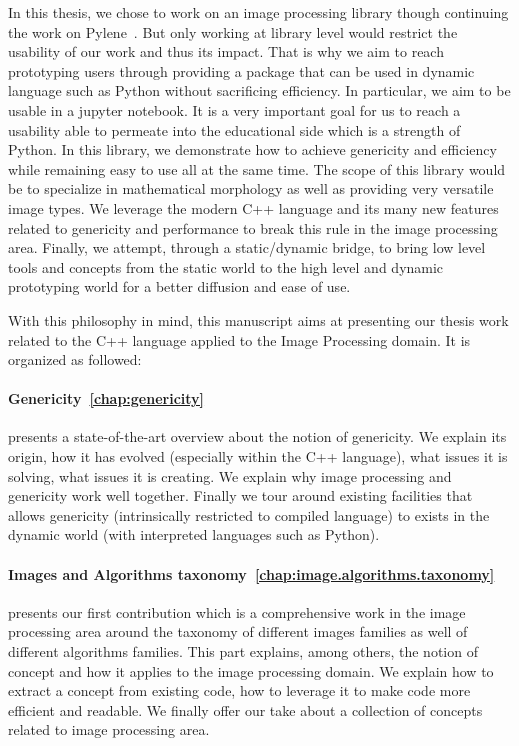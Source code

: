 In this thesis, we chose to work on an image processing library though continuing the work on
Pylene~\cite{carlinet.2018.pylena}. But only working at library level would restrict the usability of our work and thus
its impact. That is why we aim to reach prototyping users through providing a package that can be used in dynamic
language such as Python without sacrificing efficiency. In particular, we aim to be usable in a jupyter notebook. It is
a very important goal for us to reach a usability able to permeate into the educational side which is a strength of
Python. In this library, we demonstrate how to achieve genericity and efficiency while remaining easy to use all at the
same time. The scope of this library would be to specialize in mathematical morphology as well as providing very
versatile image types. We leverage the modern C++ language and its many new features related to genericity and
performance to break this rule in the image processing area. Finally, we attempt, through a static/dynamic bridge, to
bring low level tools and concepts from the static world to the high level and dynamic prototyping world for a better
diffusion and ease of use.

With this philosophy in mind, this manuscript aims at presenting our thesis work related to the C++ language applied to
the Image Processing domain. It is organized as followed:

\paragraph{Genericity~\ref{chap:genericity}} presents a state-of-the-art overview about the notion of genericity. We
explain its origin, how it has evolved (especially within the C++ language), what issues it is solving, what issues it
is creating. We explain why image processing and genericity work well together. Finally we tour around existing
facilities that allows genericity (intrinsically restricted to compiled language) to exists in the dynamic world (with
interpreted languages such as Python).

\paragraph{Images and Algorithms taxonomy~\ref{chap:image.algorithms.taxonomy}} presents our first contribution
which is a comprehensive work in the image processing area around the taxonomy of different images families as well of
different algorithms families. This part explains, among others, the notion of concept and how it applies to the image
processing domain. We explain how to extract a concept from existing code, how to leverage it to make code more
efficient and readable. We finally offer our take about a collection of concepts related to image processing area.

